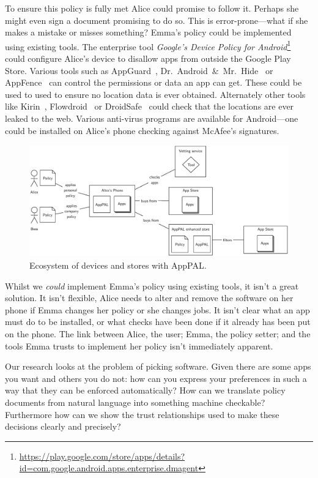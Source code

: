 \documentclass[twoside,letterpaper]{soups}
\begin{document}
To ensure this policy is fully met Alice could promise to follow it.
Perhaps she might even sign a document promising to do so.
This is error-prone---what if she makes a mistake or misses something?
Emma's policy could be implemented using existing tools.
The enterprise tool \emph{Google's Device Policy for Android}\footnote{\url{https://play.google.com/store/apps/details?id=com.google.android.apps.enterprise.dmagent}}
  could configure Alice's device to disallow apps from outside the Google Play Store.
Various tools such as AppGuard~\citep{Backes:2012vm}, Dr.~Android~\&~Mr.~Hide~\citep{Jeon:2012ki} or AppFence~\citep{Hornyack:2011wq} can control the permissions or data an app can get.
These could be used to used to ensure no location data is ever obtained.
Alternately other tools like Kirin~\citep{Enck:2009ko}, Flowdroid~\citep{Fritz:2013vi} or DroidSafe~\citep{Gordon:2015et} could check that the locations are ever leaked to the web.
Various anti-virus programs are available for Android---one could be installed on Alice's phone checking against McAfee's signatures.

\begin{figure}
\includegraphics{figures/overview.eps}
\caption{Ecosystem of devices and stores with AppPAL.}
\label{fig:ecosystem}
\end{figure}

Whilst we \emph{could} implement Emma's policy using existing tools, it isn't a great solution.
It isn't flexible, Alice needs to alter and remove the software on her phone if Emma changes her policy or she changes jobs.
It isn't clear what an app must do to be installed, or what checks have been done if it already has been put on the phone.
The link between Alice, the user; Emma, the policy setter; and the tools Emma trusts to implement her policy isn't immediately apparent.


Our research looks at the problem of picking software.
Given there are some apps you want and others you do not:
  how can you express your preferences in such a way that they can be enforced automatically?
How can we translate policy documents from natural language into something machine checkable?
Furthermore how can we show the trust relationships used to make these decisions clearly and precisely?
\end{document}
